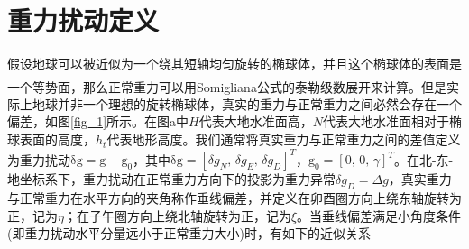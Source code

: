 \documentclass[12pt,a4,utf8]{article}
\newcommand{\upcite}[1]{\textsuperscript{\textsuperscript{\cite{#1}}}} %
\newcommand{\bmmathrm}[1]{\bm{\mathrm{#1}}}
\begin{document}
\section{重力扰动定义}

假设地球可以被近似为一个绕其短轴均匀旋转的椭球体，并且这个椭球体的表面是一个等势面，那么正常重力可以用Somigliana公式的泰勒级数展开来计算\upcite{somigliana1929teoria}。但是实际上地球并非一个理想的旋转椭球体，真实的重力与正常重力之间必然会存在一个偏差，如图\ref{fig_1}所示。在图a中$H$代表大地水准面高，$N$代表大地水准面相对于椭球表面的高度，$h_t$代表地形高度。我们通常将真实重力与正常重力之间的差值定义为重力扰动$\bmmathrm{\delta g} = \bmmathrm{g} - \bmmathrm{g}_0$，其中$\bmmathrm{\delta g} = \left [ \delta g_N ,\,\delta g_E ,\, {\delta g_D} \right ]^T $，$\bmmathrm{g}_0 = \left [ 0,\, 0, \, \gamma \right ]^T $。在北-东-地坐标系下，重力扰动在正常重力方向下的投影为重力异常$ \delta g_D = \Delta g$，真实重力与正常重力在水平方向的夹角称作垂线偏差，并定义在卯酉圈方向上绕东轴旋转为正，记为$\eta$；在子午圈方向上绕北轴旋转为正，记为$\xi$。当垂线偏差满足小角度条件(即重力扰动水平分量远小于正常重力大小)时，有如下的近似关系
 
\end{document}
